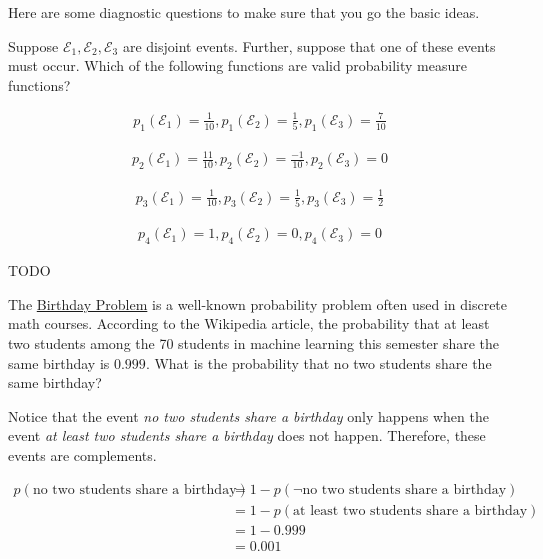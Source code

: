 \documentclass[assignment01_Solutions]{subfiles}
\begin{document}
\vspace{1em}
\begin{exercise}
Here are some diagnostic questions to make sure that you go the basic ideas. 
\bes
\item Suppose $\mathcal{E}_1, \mathcal{E}_2, \mathcal{E}_3$ are disjoint events.  Further, suppose that one of these events must occur.  Which of the following functions are valid probability measure functions?

\begin{align}
p_1(\mathcal{E}_1)=\frac{1}{10} , p_1(\mathcal{E}_2)=\frac{1}{5}, p_1(\mathcal{E}_3)=\frac{7}{10} \nonumber
\end{align}


\begin{align}
p_2(\mathcal{E}_1)=\frac{11}{10} , p_2(\mathcal{E}_2)=\frac{-1}{10}, p_2(\mathcal{E}_3)= 0 \nonumber
\end{align}



\begin{align}
p_3(\mathcal{E}_1)=\frac{1}{10} , p_3(\mathcal{E}_2)=\frac{1}{5}, p_3(\mathcal{E}_3)=\frac{1}{2} \nonumber
\end{align}



\begin{align}
p_4(\mathcal{E}_1)=1 , p_4(\mathcal{E}_2)=0, p_4(\mathcal{E}_3)=0 \nonumber
\end{align}

\begin{boxedsolution}
TODO
\end{boxedsolution}

\item The \href{https://en.wikipedia.org/wiki/Birthday_problem}{Birthday Problem} is a well-known probability problem often used in discrete math courses.  According to the Wikipedia article, the probability that at least two students among the 70 students in machine learning this semester share the same birthday is $0.999$.  What is the probability that no two students share the same birthday?

\begin{boxedsolution}
Notice that the event \emph{no two students share a birthday} only happens when the event \emph{at least two students share a birthday} does not happen.  Therefore, these events are complements.

\begin{align}
p(\mbox{no two students share a birthday}) &= 1 - p( \neg \mbox{no two students share a birthday})  \nonumber\\
&= 1 - p(\mbox{at least two students share a birthday}) \nonumber \\
&= 1 - 0.999  \nonumber\\
&= 0.001  \nonumber
\end{align}
\end{boxedsolution}

\ees
\end{exercise}
\end{document}
